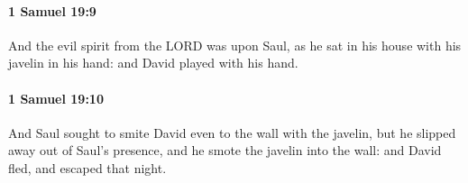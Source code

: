 		\paragraph{1 Samuel 19:9} %
			\label{1SAMUEL-19-9}

			And the evil spirit from the LORD was upon Saul, as he sat in his house with his javelin in his hand: and David played with his hand.


		\paragraph{1 Samuel 19:10} %
			\label{1SAMUEL-19-10}

			And Saul sought to smite David even to the wall with the javelin, but he slipped away out of Saul’s presence, and he smote the javelin into the wall: and David fled, and escaped that night.


